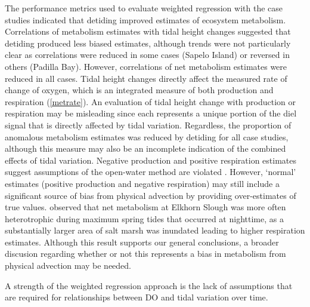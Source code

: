 \documentclass[letterpaper,12pt,oneside]{article}\usepackage[]{graphicx}\usepackage[]{color}
\begin{document}
The performance metrics used to evaluate weighted regression with the case studies indicated that detiding improved estimates of ecosystem metabolism.  Correlations of metabolism estimates with tidal height changes suggested that detiding produced less biased estimates, although trends were not particularly clear as correlations were reduced in some cases (Sapelo Island) or reversed in others (Padilla Bay).  However, correlations of net metabolism estimates were reduced in all cases.  Tidal height changes directly affect the measured rate of change of oxygen, which is an integrated measure of both production and respiration (\cref{metrate}).  An evaluation of tidal height change with production or respiration may be misleading since each represents a unique portion of the diel  signal that is directly affected by tidal variation.  Regardless, the proportion of anomalous metabolism estimates was reduced by detiding for all case studies, although this measure may also be an incomplete indication of the combined effects of tidal variation.  Negative production and positive respiration estimates suggest assumptions of the open-water method are violated \citep{Needoba12}.  However, `normal' estimates (positive production and negative respiration) may still include a significant source of bias from physical advection by providing over-estimates of true values.  \citet{Nidzieko14} observed that net metabolism at Elkhorn Slough was more often heterotrophic during maximum spring tides that occurred at nighttime, as a substantially larger area of salt marsh was inundated leading to higher respiration estimates.  Although this result supports our general conclusions, a broader discusion regarding whether or not this represents a bias in metabolism from physical advection may be needed. 

A strength of the weighted regression approach is the lack of assumptions that are required for relationships between \ac{DO} and tidal variation over time. 


\end{document}
